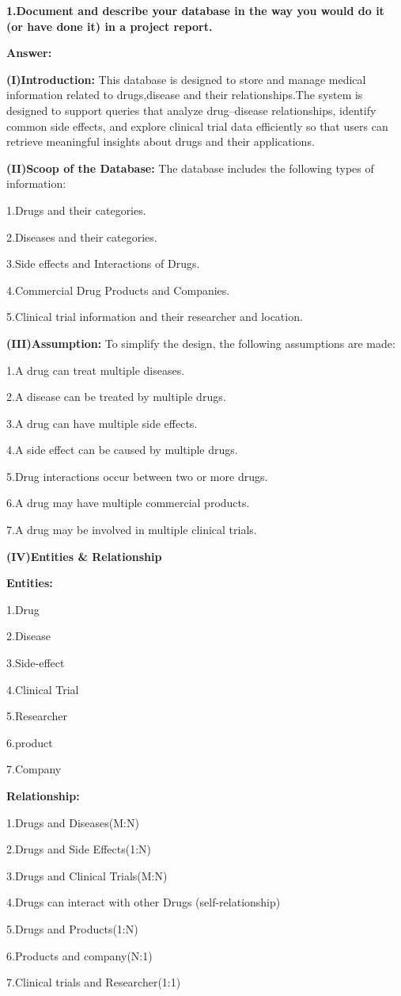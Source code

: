 \documentclass[12pt,a4paper]{article}
\begin{document}
\textbf{1.Document and describe your database in the way you would do it (or have done it) in a project report.}\par 


\textbf{Answer:}\par
\textbf{(I)Introduction:}
This database is designed to store and manage medical information related to drugs,disease and their relationships.The system is designed to support queries that analyze drug–disease relationships, identify common side effects, and explore clinical trial data efficiently so that users can retrieve meaningful insights about drugs and their applications.\par
\textbf{(II)Scoop of the Database:}
The database includes the following types of information:\par
1.Drugs and their categories.\par
2.Diseases and their categories.\par
3.Side effects and Interactions of Drugs.\par
4.Commercial Drug Products and Companies.\par
5.Clinical trial information and their researcher and location.\par
\textbf{(III)Assumption:}
To simplify the design, the following assumptions are made:\par
1.A drug can treat multiple diseases.\par
2.A disease can be treated by multiple drugs.\par
3.A drug can have multiple side effects.\par
4.A side effect can be caused by multiple drugs.\par
5.Drug interactions occur between two or more drugs.\par
6.A drug may have multiple commercial products.\par
7.A drug may be involved in multiple clinical trials.\par
\textbf{(IV)Entities \& Relationship}\par
\textbf{Entities:}\par
1.Drug\par
2.Disease\par
3.Side-effect\par
4.Clinical Trial\par
5.Researcher\par
6.product\par
7.Company\par
\textbf{Relationship:}\par
1.Drugs and Diseases(M:N)\par
2.Drugs and Side Effects(1:N)\par
3.Drugs and Clinical Trials(M:N)\par
4.Drugs can interact with other Drugs (self-relationship)\par
5.Drugs and Products(1:N)\par
6.Products and company(N:1)\par
7.Clinical trials and Researcher(1:1)\par
\end{document}
